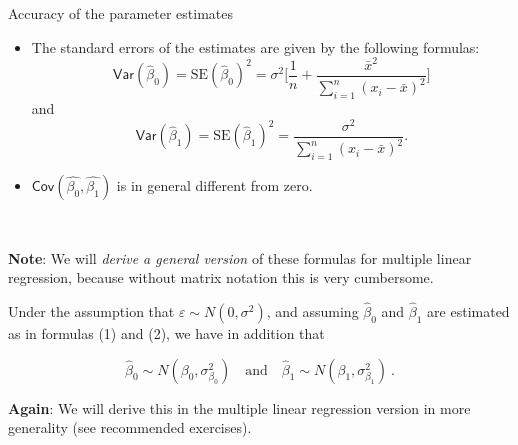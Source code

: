 \documentclass[10pt,ignorenonframetext,]{beamer}
\begin{document}
\begin{frame}

\begin{block}{Accuracy of the parameter estimates}

\vspace{2mm}

\begin{itemize}
\item
  The standard errors of the estimates are given by the following
  formulas:
  \[\mathsf{Var}(\hat{\beta}_0)=\text{SE}(\hat{\beta}_0)^2 = \sigma^2 \Big [ \frac{1}{n} + \frac{\bar{x}^2}{\sum_{i=1}^n (x_i -\bar{x})^2} \Big]\]
  and
  \[\mathsf{Var}(\hat{\beta}_1)=\text{SE}(\hat{\beta}_1)^2 = \frac{\sigma^2}{\sum_{i=1}^n (x_i-\bar{x})^2}.\]
\item
  \(\mathsf{Cov}(\hat{\beta_0},\hat{\beta_1})\) is in general different
  from zero.
\end{itemize}

\(~\) \(~\)

\textbf{Note}: We will \emph{derive a general version} of these formulas
for multiple linear regression, because without matrix notation this is
very cumbersome.

\end{block}

\end{frame}

\begin{frame}

Under the assumption that \(\varepsilon \sim N(0,\sigma^2)\), and
assuming \(\hat\beta_0\) and \(\hat\beta_1\) are estimated as in
formulas (1) and (2), we have in addition that

\[
 \hat\beta_0 \sim N(\beta_0,{\sigma^{2}_{\beta_0}}) \quad \text{and} \quad \hat\beta_1 \sim N(\beta_1,{\sigma^{2}_{\beta_1}}) \ .
\]

\vspace{6mm}

\textbf{Again}: We will derive this in the multiple linear regression
version in more generality (see recommended exercises).

\end{frame}
\end{document}
